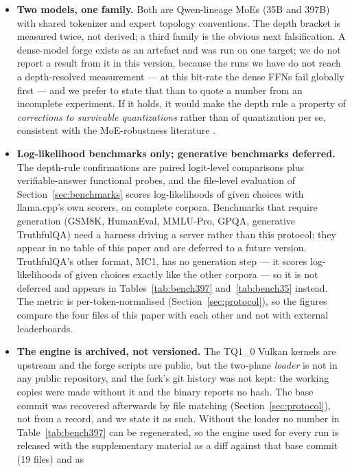 \documentclass[10pt]{article} %
\begin{document}
\begin{itemize}
\item \textbf{Two models, one family.} Both are Qwen-lineage MoEs (35B and 397B) with
  shared tokenizer and expert topology conventions. The depth bracket is
  measured twice, not derived; a third family is the obvious next
  falsification. A dense-model forge exists as an artefact and was run on one
  target; we do not report a result from it in this version, because the runs
  we have do not reach a depth-resolved measurement --- at this bit-rate the
  dense FFNs fail globally first --- and we prefer to state that than to
  quote a number from an incomplete experiment. If it holds, it would make the
  depth rule a property of \emph{corrections to survivable quantizations}
  rather than of quantization per se, consistent with the MoE-robustness
  literature \citep{kim2023moqe}.
\item \textbf{Log-likelihood benchmarks only; generative benchmarks
  deferred.} The depth-rule confirmations are paired logit-level comparisons
  plus verifiable-answer functional probes, and the file-level evaluation of
  Section~\ref{sec:benchmarks} scores log-likelihoods of given choices with
  llama.cpp's own scorers, on complete corpora. Benchmarks that require
  generation (GSM8K, HumanEval, MMLU-Pro, GPQA, generative TruthfulQA) need a
  harness driving a server rather than this protocol; they appear in no table
  of this paper and are deferred to a future version. TruthfulQA's other
  format, MC1, has no generation step --- it scores log-likelihoods of given
  choices exactly like the other corpora --- so it is not deferred and
  appears in Tables~\ref{tab:bench397} and~\ref{tab:bench35} instead. The metric is
  per-token-normalised (Section~\ref{sec:protocol}), so the figures compare
  the four files of this paper with each other and not with external
  leaderboards.
\item \textbf{The engine is archived, not versioned.} The TQ1\_0 Vulkan
  kernels are upstream and the forge scripts are public, but the two-plane
  \emph{loader} is not in any public repository, and the fork's git history
  was not kept: the working copies were made without it and the binary
  reports no hash. The base commit was recovered afterwards by file matching
  (Section~\ref{sec:protocol}), not from a record, and we state it as such.
  Without the loader no number in Table~\ref{tab:bench397} can be
  regenerated, so the engine used for every run is released with the
  supplementary material as a diff against that base commit (19 files) and as

\end{itemize}
\end{document}
